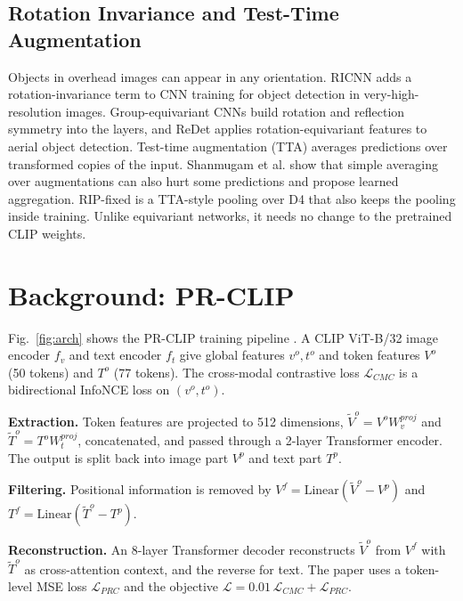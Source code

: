 \documentclass[conference]{IEEEtran}
\begin{document}
\subsection{Rotation Invariance and Test-Time Augmentation}
Objects in overhead images can appear in any orientation. RICNN \cite{cheng2016ricnn} adds a rotation-invariance term to CNN training for object detection in very-high-resolution images. Group-equivariant CNNs \cite{cohen2016gcnn} build rotation and reflection symmetry into the layers, and ReDet \cite{han2021redet} applies rotation-equivariant features to aerial object detection. Test-time augmentation (TTA) averages predictions over transformed copies of the input. Shanmugam et al. \cite{shanmugam2021tta} show that simple averaging over augmentations can also hurt some predictions and propose learned aggregation. RIP-fixed is a TTA-style pooling over D4 that also keeps the pooling inside training. Unlike equivariant networks, it needs no change to the pretrained CLIP weights.

\section{Background: PR-CLIP}
\label{sec:background}
Fig.~\ref{fig:arch} shows the PR-CLIP training pipeline \cite{guan2025prclip}. A CLIP ViT-B/32 \cite{dosovitskiy2021vit} image encoder $f_v$ and text encoder $f_t$ give global features $v^o, t^o$ and token features $V^o$ (50 tokens) and $T^o$ (77 tokens). The cross-modal contrastive loss $\mathcal{L}_{CMC}$ is a bidirectional InfoNCE loss on $(v^o, t^o)$.

\textbf{Extraction.} Token features are projected to 512 dimensions, $\tilde V^o = V^o W_v^{proj}$ and $\tilde T^o = T^o W_t^{proj}$, concatenated, and passed through a 2-layer Transformer encoder. The output is split back into image part $V^p$ and text part $T^p$.

\textbf{Filtering.} Positional information is removed by $V^f = \mathrm{Linear}(\tilde V^o - V^p)$ and $T^f = \mathrm{Linear}(\tilde T^o - T^p)$.

\textbf{Reconstruction.} An 8-layer Transformer decoder reconstructs $\tilde V^o$ from $V^f$ with $\tilde T^o$ as cross-attention context, and the reverse for text. The paper uses a token-level MSE loss $\mathcal{L}_{PRC}$ and the objective $\mathcal{L} = 0.01\,\mathcal{L}_{CMC} + \mathcal{L}_{PRC}$.
\end{document}
